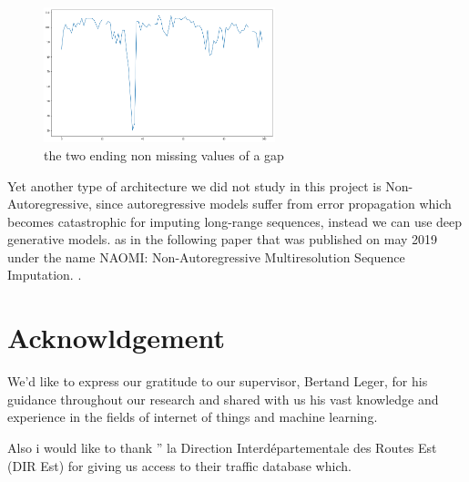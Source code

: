 \begin{figure}[H]
\centering
\includegraphics[width=0.6\textwidth]{img/extrapoalting.png}
\caption{the two ending non missing values of a gap}
\label{fig:extrapo}
\end{figure}

Yet another type of architecture we did not study in this project is Non-Autoregressive, since  autoregressive models  suffer from error propagation which becomes catastrophic for imputing long-range sequences, instead we can use  deep generative models. as in the following paper that was published on may 2019 under the name NAOMI: Non-Autoregressive Multiresolution
Sequence Imputation. \cite{naomi}.




\section{Acknowldgement}

We'd like to express our gratitude to our supervisor, Bertand Leger, for his guidance  throughout our research and shared with us his vast knowledge and
experience in the fields of internet of things and machine learning.

Also i would like to thank   '' la Direction Interdépartementale des Routes Est (DIR Est) for giving us access to their traffic database which. 


